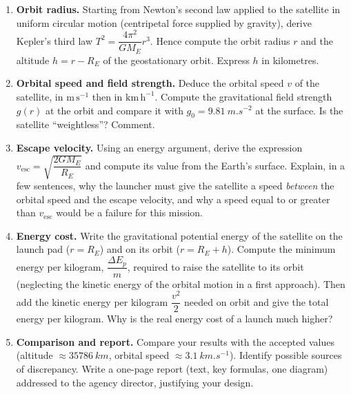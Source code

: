 \documentclass[11pt]{article}
\newcounter{popsec}
\newcounter{popsub}
\newcommand{\courssub}[1]{%
  \stepcounter{popsub}%
  \par\vspace{9pt}\noindent{\popxbold\fontsize{11.5}{13}\selectfont\color{popink}{\color{poporange}\thepopsec.\thepopsub}\hspace{6pt}#1}\par\nopagebreak\vspace{4pt}
}
\begin{document}
\begin{exercice}
\begin{enumerate}
\item \textbf{Orbit radius.} Starting from Newton's second law applied to the satellite in uniform circular motion (centripetal force supplied by gravity), derive Kepler's third law $T^{2} = \dfrac{4\pi^{2}}{GM_{E}}r^{3}$. Hence compute the orbit radius $r$ and the altitude $h = r - R_{E}$ of the geostationary orbit. Express $h$ in kilometres.

\item \textbf{Orbital speed and field strength.} Deduce the orbital speed $v$ of the satellite, in $\mathrm{m\,s^{-1}}$ then in $\mathrm{km\,h^{-1}}$. Compute the gravitational field strength $g(r)$ at the orbit and compare it with $g_{0} = \SI{9.81}{m.s^{-2}}$ at the surface. Is the satellite ``weightless''? Comment.

\item \textbf{Escape velocity.} Using an energy argument, derive the expression $v_{\mathrm{esc}} = \sqrt{\dfrac{2GM_{E}}{R_{E}}}$ and compute its value from the Earth's surface. Explain, in a few sentences, why the launcher must give the satellite a speed \emph{between} the orbital speed and the escape velocity, and why a speed equal to or greater than $v_{\mathrm{esc}}$ would be a failure for this mission.

\item \textbf{Energy cost.} Write the gravitational potential energy of the satellite on the launch pad ($r = R_{E}$) and on its orbit ($r = R_{E} + h$). Compute the minimum energy per kilogram, $\dfrac{\Delta E_{p}}{m}$, required to raise the satellite to its orbit (neglecting the kinetic energy of the orbital motion in a first approach). Then add the kinetic energy per kilogram $\dfrac{v^{2}}{2}$ needed on orbit and give the total energy per kilogram. Why is the real energy cost of a launch much higher?

\item \textbf{Comparison and report.} Compare your results with the accepted values (altitude $\approx \SI{35786}{km}$, orbital speed $\approx \SI{3.1}{km.s^{-1}}$). Identify possible sources of discrepancy. Write a one-page report (text, key formulas, one diagram) addressed to the agency director, justifying your design.
\end{enumerate}
\end{exercice}

\courssub{Model Solution}
\end{document}
